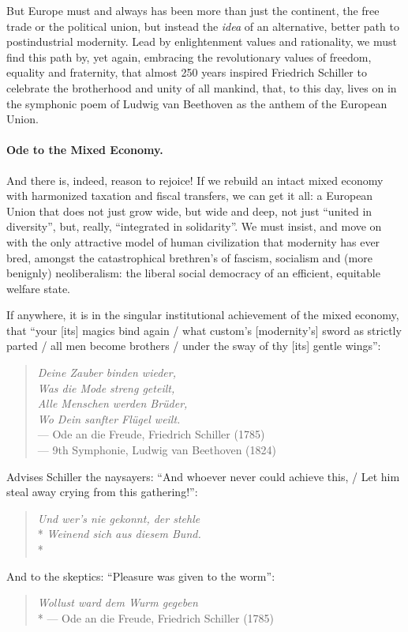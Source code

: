 But Europe must and always has been more than just the continent, the free trade or the political union, but instead the \emph{idea} of an alternative, better path to postindustrial modernity. Lead by enlightenment values and rationality, we must find this path by, yet again, embracing the revolutionary values of freedom, equality and fraternity, that almost 250 years inspired Friedrich Schiller to celebrate the brotherhood and unity of all mankind, that, to this day, lives on in the symphonic poem of Ludwig van Beethoven as the anthem of the European Union.

\paragraph{Ode to the Mixed Economy.} And there is, indeed, reason to rejoice! If we rebuild an intact mixed economy with harmonized taxation and fiscal transfers, we can get it all: a European Union that does not just grow wide, but wide and deep, not just ``united in diversity'', but, really, ``integrated in solidarity''. We must insist, and move on with the only attractive model of human civilization that modernity has ever bred, amongst the catastrophical brethren's of fascism, socialism and (more benignly) neoliberalism: the liberal social democracy of an efficient, equitable welfare state.

If anywhere, it is in the singular institutional achievement of the mixed economy, that ``your [its] magics bind again / what custom's [modernity's] sword as strictly parted / all men become brothers / under the sway of thy [its] gentle wings'':
\begin{verse}
	\emph{Deine Zauber binden wieder,}\\
	\emph{Was die Mode streng geteilt,}\\
	\emph{Alle Menschen werden Br\"{u}der,}\\
	\emph{Wo Dein sanfter Fl\"{u}gel weilt.}\\
	--- Ode an die Freude, Friedrich Schiller (1785)\\
	--- 9th Symphonie, Ludwig van Beethoven (1824)
\end{verse}

	Advises Schiller the naysayers: ``And whoever never could achieve this, / Let him steal away crying from this gathering!'':
	\begin{verse}
		\emph{Und wer's nie gekonnt, der stehle}\\*
		\emph{Weinend sich aus diesem Bund.}\\*
	\end{verse}
	
	And to the skeptics: ``Pleasure was given to the worm'':
	\begin{verse}
		\emph{Wollust ward dem Wurm gegeben}\\*
		--- Ode an die Freude, Friedrich Schiller (1785) 
	\end{verse} %